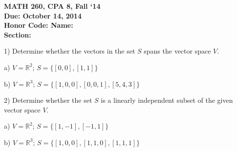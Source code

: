 \documentclass{article}
\begin{document}
\begin{flushleft}
	\bfseries{MATH 260, CPA 8, Fall `14}\\
	\bfseries{Due: October 14, 2014}\\
	\bfseries{Honor Code:} \hspace{3.5in}\bfseries{Name:}\\
	\hspace{4.37in}\bfseries{Section:}
\end{flushleft}
\vspace{.25in}
\begin{flushleft}

1) Determine whether the vectors in the set $S$ spans the vector space $V$.

\vspace{0.2in}

a) $V = \mathbb{R}^2$; $S = \{[0,0],[1,1]\}$

\vspace{1.25in}

b) $V = \mathbb{R}^3$; $S = \{[1,0,0],[0,0,1],[5,4,3]\}$

\vspace{1.25in}

2) Determine whether the set $S$ is a linearly independent subset of the given vector space $V$.

\vspace{0.2in}

a) $V = \mathbb{R}^2$; $S = \{[1,-1],[-1,1]\}$

\vspace{1.25in}

b) $V = \mathbb{R}^3$; $S = \{[1,0,0],[1,1,0],[1,1,1]\}$

\vspace{1.25in}

\end{flushleft}
\end{document}
